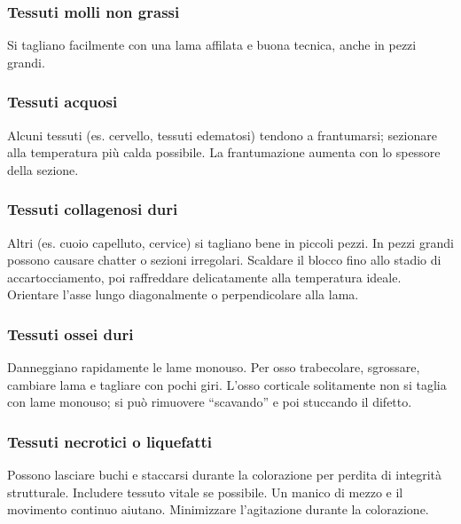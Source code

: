 \subsubsection{Tessuti molli non grassi} 
Si tagliano facilmente con una lama affilata e buona tecnica, anche in pezzi grandi.
\subsubsection{Tessuti acquosi} 
Alcuni tessuti (es. cervello, tessuti edematosi) tendono a frantumarsi; sezionare alla temperatura più calda possibile. La frantumazione aumenta con lo spessore della sezione.
\subsubsection{Tessuti collagenosi duri}
Altri (es. cuoio capelluto, cervice) si tagliano bene in piccoli pezzi. In pezzi grandi possono causare chatter o sezioni irregolari. Scaldare il blocco fino allo stadio di accartocciamento, poi raffreddare delicatamente alla temperatura ideale. Orientare l'asse lungo diagonalmente o perpendicolare alla lama.
\subsubsection{Tessuti ossei duri} 
Danneggiano rapidamente le lame monouso. Per osso trabecolare, sgrossare, cambiare lama e tagliare con pochi giri. L'osso corticale solitamente non si taglia con lame monouso; si può rimuovere ``scavando'' e poi stuccando il difetto.
\subsubsection{Tessuti necrotici o liquefatti} 
Possono lasciare buchi e staccarsi durante la colorazione per perdita di integrità strutturale. Includere tessuto vitale se possibile. Un manico di mezzo e il movimento continuo aiutano. Minimizzare l'agitazione durante la colorazione.
